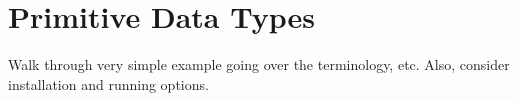 \section{Primitive Data Types}
Walk through very simple example going over the terminology, etc.  Also, consider installation and running options.